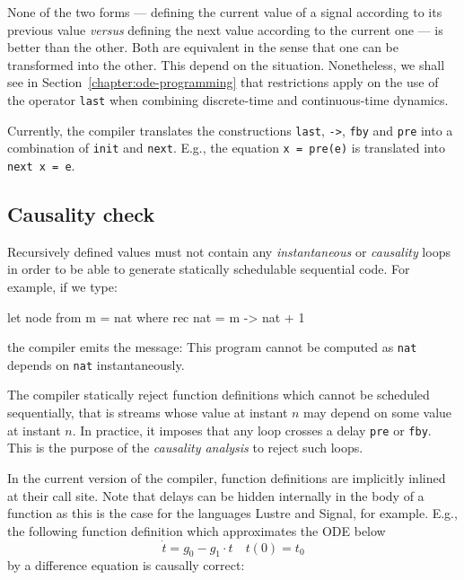 \documentclass[11pt,titlepage,twoside]{report}
\newcommand{\lustre}{{\sf Lustre}}
\newcommand{\signal}{{\sf Signal}}
\begin{document}
None of the two forms --- defining the current value of a signal
according to its previous value \emph{versus} defining the next value
according to the current one --- is better than the other. Both are
equivalent in the sense that one can be transformed into the
other. This depend on the situation. Nonetheless, we shall see in
Section~\ref{chapter:ode-programming} that restrictions apply on the
use of the operator \texttt{last} when combining discrete-time and
continuous-time dynamics.

Currently, the compiler translates the
constructions \verb-last-, \verb+->+, \verb-fby- and \verb+pre+ into
a combination of \verb-init- and \verb-next-. E.g., the equation \texttt{x = pre(e)}
is translated into \texttt{next x = e}.

\subsection{Causality check}
\label{causality-check}
Recursively defined values must not contain any {\em instantaneous} or
{\em causality} loops in order to be able to generate statically schedulable
sequential code. For example, if we type:
\begin{runverbatim}[fail]
let node from m = nat where
  rec nat = m -> nat + 1
\end{runverbatim}
the compiler emits the message:
\runverbatimerr
This program cannot be computed as {\tt nat} depends on {\tt nat}
instantaneously.

The compiler statically reject function definitions which cannot be scheduled
sequentially, that is streams whose value at instant $n$ may depend on
some value at instant $n$. In practice, it imposes that any loop
crosses a delay \verb-pre- or \verb-fby-. This is the purpose of
the \emph{causality analysis} to reject such loops.

In the current version of the compiler, function definitions are
implicitly inlined at their call site. Note that delays can be hidden
internally in the body of a function as this is the case for the languages \lustre{}
and \signal, for example. E.g., the following function definition
which approximates the \ac{ODE} below
\[
\dot{t} = g_0 - g_1 \cdot t \quad t(0) = t_0
\]
by a difference equation is causally correct:
\end{document}
